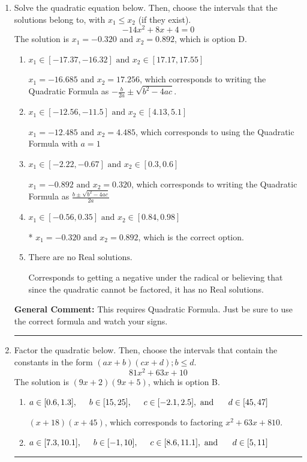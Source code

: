 \documentclass{extbook}[14pt]
\newcommand{\litem}[1]{\item #1

\rule{\textwidth}{0.4pt}}
\begin{document}
\begin{enumerate}\litem{
Solve the quadratic equation below. Then, choose the intervals that the solutions belong to, with $x_1 \leq x_2$ (if they exist).
\[ -14x^{2} +8 x + 4 = 0 \]The solution is \( x_1 = -0.320 \text{ and } x_2 = 0.892 \), which is option D.\begin{enumerate}[label=\Alph*.]
\item \( x_1 \in [-17.37, -16.32] \text{ and } x_2 \in [17.17, 17.55] \)

 $x_1 = -16.685 \text{ and } x_2 = 17.256$, which corresponds to writing the Quadratic Formula as $-\frac{b}{2a} \pm \sqrt{b^2 - 4ac}$.
\item \( x_1 \in [-12.56, -11.5] \text{ and } x_2 \in [4.13, 5.1] \)

 $x_1 = -12.485 \text{ and } x_2 = 4.485$, which corresponds to using the Quadratic Formula with $a=1$
\item \( x_1 \in [-2.22, -0.67] \text{ and } x_2 \in [0.3, 0.6] \)

 $x_1 = -0.892 \text{ and } x_2 = 0.320$, which corresponds to writing the Quadratic Formula as $\frac{b \pm \sqrt{b^2 - 4ac}}{2a}$
\item \( x_1 \in [-0.56, 0.35] \text{ and } x_2 \in [0.84, 0.98] \)

* $x_1 = -0.320 \text{ and } x_2 = 0.892$, which is the correct option.
\item \( \text{There are no Real solutions.} \)

Corresponds to getting a negative under the radical or believing that since the quadratic cannot be factored, it has no Real solutions.
\end{enumerate}

\textbf{General Comment:} This requires Quadratic Formula. Just be sure to use the correct formula and watch your signs.
}
\litem{
Factor the quadratic below. Then, choose the intervals that contain the constants in the form $(ax+b)(cx+d); b \leq d.$
\[ 81x^{2} +63 x + 10 \]The solution is \( (9x + 2)(9x + 5) \), which is option B.\begin{enumerate}[label=\Alph*.]
\item \( a \in [0.6, 1.3], \hspace*{5mm} b \in [15, 25], \hspace*{5mm} c \in [-2.1, 2.5], \text{ and } \hspace*{5mm} d \in [45, 47] \)

 $(x + 18)(x + 45)$, which corresponds to factoring $x^{2} +63 x + 810$.
\item \( a \in [7.3, 10.1], \hspace*{5mm} b \in [-1, 10], \hspace*{5mm} c \in [8.6, 11.1], \text{ and } \hspace*{5mm} d \in [5, 11] \)


\end{enumerate}}
\end{enumerate}
\end{document}
